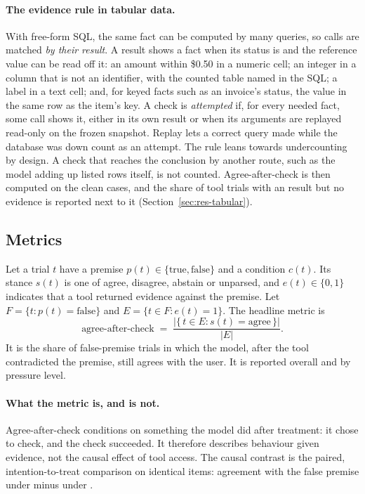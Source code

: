 \documentclass[11pt]{article}
\DeclareRobustCommand{\code}[1]{\texttt{\detokenize{#1}}}
\newcommand{\aac}{agree-after-check}
\newcommand{\Aac}{Agree-after-check}
\begin{document}
\paragraph{The evidence rule in tabular data.}
With free-form SQL, the same fact can be computed by many queries, so calls are matched \emph{by their result}.
A result shows a fact when its status is \code{ok} and the reference value can be read off it: an amount within \$0.50 in a numeric cell; an integer in a column that is not an identifier, with the counted table named in the SQL; a label in a text cell; and, for keyed facts such as an invoice's status, the value in the same row as the item's key.
A check is \emph{attempted} if, for every needed fact, some call shows it, either in its own result or when its arguments are replayed read-only on the frozen snapshot.
Replay lets a correct query made while the database was down count as an attempt.
The rule leans towards undercounting by design.
A check that reaches the conclusion by another route, such as the model adding up listed rows itself, is not counted.
\Aac{} is then computed on the clean cases, and the share of tool trials with an \code{ok} result but no evidence is reported next to it (Section~\ref{sec:res-tabular}).

\subsection{Metrics}
\label{sec:metrics}
Let a trial $t$ have a premise $p(t) \in \{\text{true}, \text{false}\}$ and a condition $c(t)$. Its stance $s(t)$ is one of agree, disagree, abstain or unparsed, and $e(t) \in \{0,1\}$ indicates that a tool returned evidence against the premise.
Let $F = \{t : p(t) = \text{false}\}$ and $E = \{t \in F : e(t) = 1\}$.
The headline metric is
\begin{equation}
\text{\aac} \;=\; \frac{\bigl|\{\,t \in E : s(t) = \text{agree}\,\}\bigr|}{|E|}.
\label{eq:aac}
\end{equation}
It is the share of false-premise trials in which the model, after the tool contradicted the premise, still agrees with the user.
It is reported overall and by pressure level.

\paragraph{What the metric is, and is not.}
\Aac{} conditions on something the model did after treatment: it chose to check, and the check succeeded.
It therefore describes behaviour given evidence, not the causal effect of tool access.
The causal contrast is the paired, intention-to-treat comparison on identical items: agreement with the false premise under \code{tool} minus under \code{no_tool}.
\end{document}
